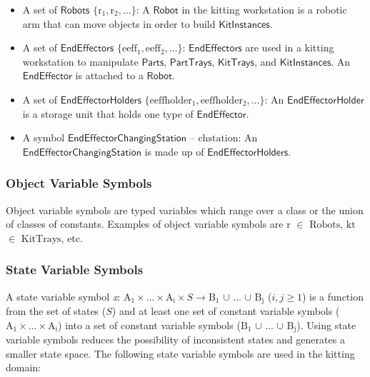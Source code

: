 \documentclass[a4paper, 10pt, conference]{ieeeconf}      %
\begin{document}
\begin{itemize}
\item A set of $\mathsf{Robots}$ $\lbrace\mathrm{r_1, r_2,\dots\rbrace}$: A $\mathsf{Robot}$ in the kitting workstation is a robotic arm that can move objects in order to build $\mathsf{KitInstances}$.

\item A set of $\mathsf{EndEffectors}$ $\lbrace\mathrm{eeff_1,eeff_2,\dots\rbrace}$: $\mathsf{EndEffectors}$ are used in a kitting workstation to manipulate $\mathsf{Parts}$, $\mathsf{PartTrays}$, $\mathsf{KitTrays}$, and $\mathsf{KitInstances}$. An $\mathsf{EndEffector}$ is attached to a $\mathsf{Robot}$.

\item A set of $\mathsf{EndEffectorHolders}$  $\lbrace\mathrm{eeffholder_1,eeffholder_2,\dots\rbrace}$: An $\mathsf{EndEffectorHolder}$ is a storage unit that holds one type of $\mathsf{EndEffector}$.

\item A symbol $\mathsf{EndEffectorChangingStation}$ -- $\mathrm{chstation}$: An $\mathsf{EndEffectorChangingStation}$ is made up of $\mathsf{EndEffectorHolders}$.
\end{itemize}

\subsubsection{Object Variable Symbols}
Object variable symbols are typed variables which range over a class or the union of classes of constants. Examples of object variable symbols are $\mathrm{r}$ $\in$ $\mathrm{Robots}$, $\mathrm{kt}$ $\in$ $\mathrm{KitTrays}$, etc.

\subsubsection{State Variable Symbols}
A state variable symbol \emph{x}: $\mathrm{A_1\times \dots\times A_i}\times S\rightarrow\mathrm{B_1}$ $\cup$ $\dots$ $\cup$ $\mathrm{B_j}$ ($i, j\geq 1$) is a function from the set of states ($S$) and at least one set of constant variable symbols ($\mathrm{A_1\times \dots\times A_i}$) into a set of constant variable symbols ($\mathrm{B_1}$ $\cup$ $\dots$ $\cup$ $\mathrm{B_j}$). Using state variable symbols reduces the possibility of inconsistent states and generates a smaller state space. The following state variable symbols are used in the kitting domain:
\end{document}
